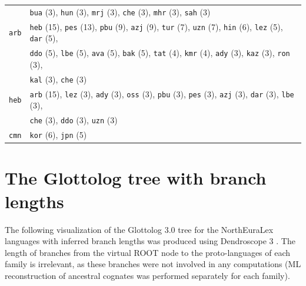 \begin{center}
\begin{longtable}{ll}
 & \texttt{bua} (3), \texttt{hun} (3), \texttt{mrj} (3), \texttt{che} (3), \texttt{mhr} (3), \texttt{sah} (3) \\
\texttt{arb} & \texttt{heb} (15), \texttt{pes} (13), \texttt{pbu} (9), \texttt{azj} (9), \texttt{tur} (7), \texttt{uzn} (7), \texttt{hin} (6), \texttt{lez} (5), \texttt{dar} (5), \\
 & \texttt{ddo} (5), \texttt{lbe} (5), \texttt{ava} (5), \texttt{bak} (5), \texttt{tat} (4), \texttt{kmr} (4), \texttt{ady} (3), \texttt{kaz} (3), \texttt{ron} (3), \\
 & \texttt{kal} (3), \texttt{che} (3) \\
\texttt{heb} & \texttt{arb} (15), \texttt{lez} (3), \texttt{ady} (3), \texttt{oss} (3), \texttt{pbu} (3), \texttt{pes} (3), \texttt{azj} (3), \texttt{dar} (3), \texttt{lbe} (3), \\
 & \texttt{che} (3), \texttt{ddo} (3), \texttt{uzn} (3) \\
\texttt{cmn} & \texttt{kor} (6), \texttt{jpn} (5) \\

\end{longtable}
 \addtocounter{table}{-1} 
\end{center}

\section{The Glottolog tree with branch lengths}

The following visualization of the Glottolog 3.0 tree for the NorthEuraLex languages with inferred branch lengths was produced using Dendroscope 3 \citep{dendroscope}. The length of branches from the virtual ROOT node to the proto-languages of each family is irrelevant, as these branches were not involved in any computations (ML reconstruction of ancestral cognates was performed separately for each family).

